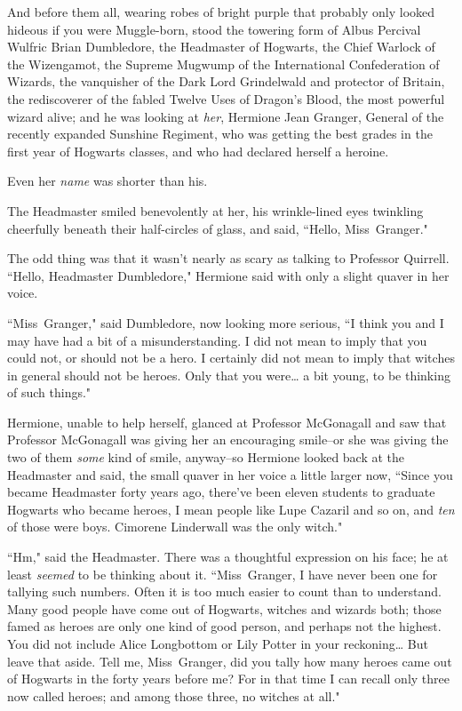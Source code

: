 And before them all, wearing robes of bright purple that probably only looked hideous if you were Muggle-born, stood the towering form of Albus Percival Wulfric Brian Dumbledore, the Headmaster of Hogwarts, the Chief Warlock of the Wizengamot, the Supreme Mugwump of the International Confederation of Wizards, the vanquisher of the Dark Lord Grindelwald and protector of Britain, the rediscoverer of the fabled Twelve Uses of Dragon's Blood, the most powerful wizard alive; and he was looking at \emph{her}, Hermione Jean Granger, General of the recently expanded Sunshine Regiment, who was getting the best grades in the first year of Hogwarts classes, and who had declared herself a heroine.

Even her \emph{name} was shorter than his.

The Headmaster smiled benevolently at her, his wrinkle-lined eyes twinkling cheerfully beneath their half-circles of glass, and said, ``Hello, Miss~Granger."

The odd thing was that it wasn't nearly as scary as talking to Professor Quirrell. ``Hello, Headmaster Dumbledore," Hermione said with only a slight quaver in her voice.

``Miss~Granger," said Dumbledore, now looking more serious, ``I think you and I may have had a bit of a misunderstanding. I did not mean to imply that you could not, or should not be a hero. I certainly did not mean to imply that witches in general should not be heroes. Only that you were{\ldots} a bit young, to be thinking of such things."

Hermione, unable to help herself, glanced at Professor McGonagall and saw that Professor McGonagall was giving her an encouraging smile\---or she was giving the two of them \emph{some} kind of smile, anyway\---so Hermione looked back at the Headmaster and said, the small quaver in her voice a little larger now, ``Since you became Headmaster forty years ago, there've been eleven students to graduate Hogwarts who became heroes, I mean people like Lupe Cazaril and so on, and \emph{ten} of those were boys. Cimorene Linderwall was the only witch."

``Hm," said the Headmaster. There was a thoughtful expression on his face; he at least \emph{seemed} to be thinking about it. ``Miss~Granger, I have never been one for tallying such numbers. Often it is too much easier to count than to understand. Many good people have come out of Hogwarts, witches and wizards both; those famed as heroes are only one kind of good person, and perhaps not the highest. You did not include Alice Longbottom or Lily Potter in your reckoning{\ldots} But leave that aside. Tell me, Miss~Granger, did you tally how many heroes came out of Hogwarts in the forty years before me? For in that time I can recall only three now called heroes; and among those three, no witches at all."

